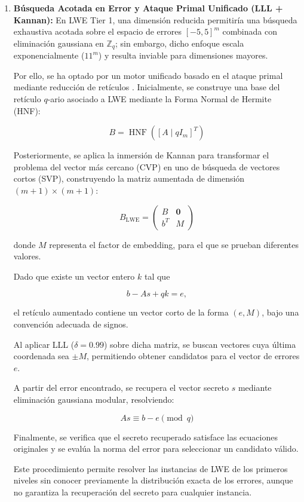 \documentclass[12pt,a4paper]{article}
\begin{document}
\begin{enumerate}
    \item \textbf{Búsqueda Acotada en Error y Ataque
    Primal Unificado (LLL + Kannan):}
    En LWE Tier 1, una dimensión reducida permitiría
    una búsqueda exhaustiva acotada sobre el espacio
    de errores $[-5,5]^m$ combinada con eliminación
    gaussiana en $\mathbb{Z}_q$; sin embargo,
    dicho enfoque escala exponencialmente ($11^m$)
    y resulta inviable para dimensiones mayores.

    Por ello, se ha optado por un motor unificado
    basado en el ataque primal mediante reducción
    de retículos \cite{albrecht2015}. Inicialmente, se construye una
    base del retículo $q$-ario asociado a LWE
    mediante la Forma Normal de Hermite (HNF):

    \[
        B = \operatorname{HNF}
        \left([A \mid qI_m]^T\right)
    \]

    Posteriormente, se aplica la inmersión de Kannan \cite{kannan1987}
    para transformar el problema del vector más
    cercano (CVP) en uno de búsqueda de vectores
    cortos (SVP), construyendo la matriz aumentada
    de dimensión $(m+1)\times(m+1)$:

    \[
        B_{\mathrm{LWE}} =
        \begin{pmatrix}
            B & \mathbf{0} \\
            b^T & M
        \end{pmatrix}
    \]

    donde $M$ representa el factor de embedding,
    para el que se prueban diferentes valores.

    Dado que existe un vector entero $k$ tal que

    \[
        b-As+qk=e,
    \]

    el retículo aumentado contiene un vector corto
    de la forma $(e,M)$, bajo una convención adecuada
    de signos.

    Al aplicar LLL \cite{lenstra1982} ($\delta=0.99$) sobre dicha matriz,
    se buscan vectores cuya última coordenada sea
    $\pm M$, permitiendo obtener candidatos para
    el vector de errores $e$.

    A partir del error encontrado, se recupera
    el vector secreto $s$ mediante eliminación
    gaussiana modular, resolviendo:

    \[
        As \equiv b-e \pmod q
    \]

    Finalmente, se verifica que el secreto recuperado
    satisface las ecuaciones originales y se evalúa
    la norma del error para seleccionar un candidato
    válido.

    Este procedimiento permite resolver las instancias
    de LWE de los primeros niveles sin conocer
    previamente la distribución exacta de los errores,
    aunque no garantiza la recuperación del secreto
    para cualquier instancia.

\end{enumerate}
\end{document}

